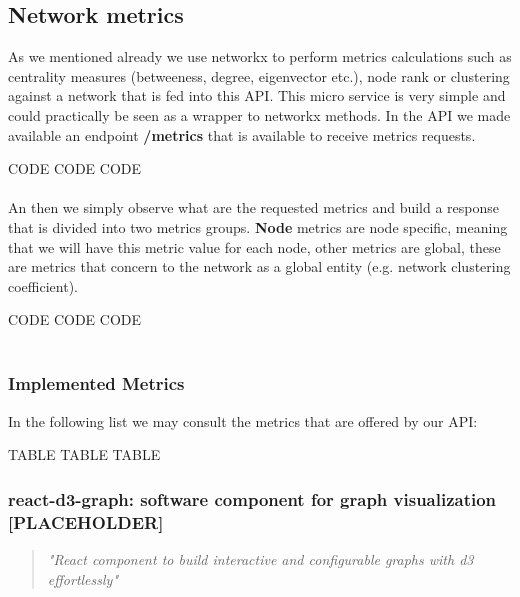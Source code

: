 \subsection{Network metrics}
As we mentioned already we use networkx to perform metrics calculations such as centrality measures (betweeness, degree, eigenvector etc.), node rank or clustering against a network that is fed into this API. This micro service is very simple and could practically be seen as a wrapper to networkx methods. In the API we made available an endpoint \textbf{/metrics} that is available to receive metrics requests.

CODE CODE CODE\\
\\

An then we simply observe what are the requested metrics and build a response that is divided into two metrics groups. \textbf{Node} metrics are node specific, meaning that we will have this metric value for each node, other metrics are global, these are metrics that concern to the network as a global entity (e.g. network clustering coefficient).

CODE CODE CODE\\
\\

\subsubsection{Implemented Metrics}
In the following list we may consult the metrics that are offered by our API:

TABLE TABLE TABLE

%
\subsubsection{react-d3-graph: software component for graph visualization [PLACEHOLDER]}
\begin{quote}
\textit{"React component to build interactive and configurable graphs with d3 effortlessly"}
\end{quote}

